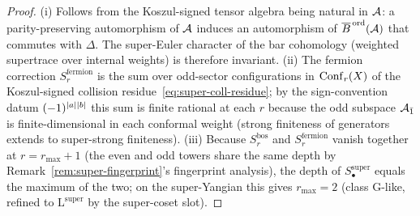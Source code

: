 \begin{proof}
(i) Follows from the Koszul-signed tensor algebra being natural in
$\mathcal{A}$: a parity-preserving automorphism of $\mathcal{A}$ induces an
automorphism of $\overline{B}^{\,\mathrm{ord}}(\mathcal{A})$ that commutes with
$\Delta$. The super-Euler character of the bar cohomology (weighted
supertrace over internal weights) is therefore invariant. (ii) The
fermion correction $S_r^{\mathrm{fermion}}$ is the sum over
odd-sector configurations in $\mathrm{Conf}_r(X)$ of the Koszul-signed
collision residue~\eqref{eq:super-coll-residue}; by the sign-convention
datum $(-1)^{|a||b|}$ this sum is finite rational at
each $r$ because the odd subspace $\mathcal{A}_{\bar{1}}$ is
finite-dimensional in each conformal weight (strong finiteness of
generators extends to super-strong finiteness).
(iii) Because $S_r^{\mathrm{bos}}$ and $S_r^{\mathrm{fermion}}$ vanish
together at $r=r_{\max}+1$ (the even and odd towers share the same
depth by Remark~\ref{rem:super-fingerprint}'s fingerprint analysis),
the depth of $S_\bullet^{\mathrm{super}}$ equals the maximum of the
two; on the super-Yangian this gives $r_{\max}=2$ (class $\mathrm{G}$-like,
refined to $\mathrm{L}^{\mathrm{super}}$ by the super-coset slot).
\end{proof}

